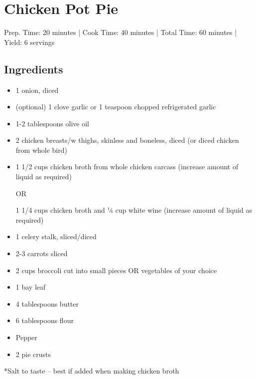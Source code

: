 \section{Chicken Pot Pie}

\begin{center}
Prep. Time: 20 minutes |
Cook Time: 40 minutes | 
Total Time: 60 minutes | 
Yield: 6 servings
\end{center}

\subsection{Ingredients}
\begin{multicols}{2}
\begin{itemize}
    \item 1 onion, diced
    \item (optional) 1 clove garlic or 1 teaspoon chopped refrigerated garlic 
    \item 1-2 tablespoons olive oil
    \item 2 chicken breasts/w thighs, skinless and boneless, diced (or diced chicken from whole bird)
    \item 1 1/2 cups chicken broth from whole chicken carcass
          (increase amount of liquid as required)\par
          OR \par
          1 1/4 cups chicken broth and ¼ cup white wine (increase amount of liquid as required)
    \item 1 celery stalk, sliced/diced
    \item 2-3 carrots sliced
    \item 2 cups broccoli cut into small pieces OR vegetables of your choice
    \item 1 bay leaf
    \item 4 tablespoons butter
    \item 6 tablespoons flour
    \item Pepper
    \item 2 pie crusts
\end{itemize}
\end{multicols}
*Salt to taste – best if added when making chicken broth 

